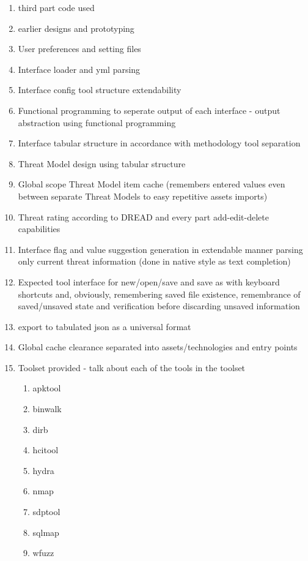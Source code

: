 \begin{enumerate}
\begin{enumerate}
		\item third part code used
		
		\item earlier designs and prototyping
		
		\item User preferences and setting files
		\item Interface loader and yml parsing
		\item Interface config tool structure extendability
		\item Functional programming to seperate output of each interface - output abstraction using functional programming
		\item Interface tabular structure in accordance with methodology tool separation
		
		\item Threat Model design using tabular structure 
		\item Global scope Threat Model item cache (remembers entered values even between separate Threat Models to easy repetitive assets imports)
		\item Threat rating according to DREAD and every part add-edit-delete capabilities
		\item Interface flag and value suggestion generation in extendable manner parsing only current threat information (done in native style as text completion)
		
		\item Expected tool interface for new/open/save and save as with keyboard shortcuts and, obviously, remembering saved file existence, remembrance of saved/unsaved state and verification before discarding unsaved information
		\item export to tabulated json as a universal format
		\item Global cache clearance separated into assets/technologies and entry points
		
		\item Toolset provided - talk about each of the tools in the toolset
		\begin{enumerate}
			\item apktool
			\item binwalk
			\item dirb
			\item hcitool
			\item hydra
			\item nmap
			\item sdptool
			\item sqlmap
			\item wfuzz
		\end{enumerate}
		

\end{enumerate}
\end{enumerate}

